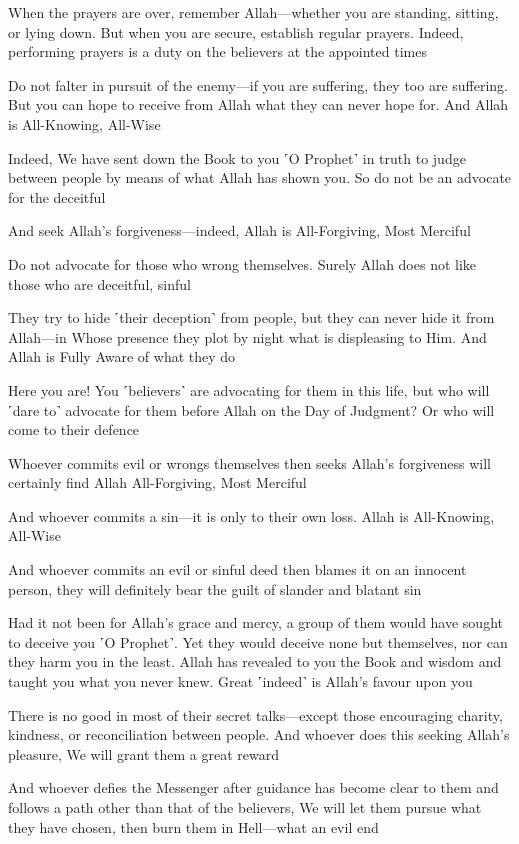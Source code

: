 When the prayers are over, remember Allah—whether you are standing, sitting, or lying down. But when you are secure, establish regular prayers. Indeed, performing prayers is a duty on the believers at the appointed times

Do not falter in pursuit of the enemy—if you are suffering, they too are suffering. But you can hope to receive from Allah what they can never hope for. And Allah is All-Knowing, All-Wise

Indeed, We have sent down the Book to you ˹O Prophet˺ in truth to judge between people by means of what Allah has shown you. So do not be an advocate for the deceitful

And seek Allah’s forgiveness—indeed, Allah is All-Forgiving, Most Merciful

Do not advocate for those who wrong themselves. Surely Allah does not like those who are deceitful, sinful

They try to hide ˹their deception˺ from people, but they can never hide it from Allah—in Whose presence they plot by night what is displeasing to Him. And Allah is Fully Aware of what they do

Here you are! You ˹believers˺ are advocating for them in this life, but who will ˹dare to˺ advocate for them before Allah on the Day of Judgment? Or who will come to their defence

Whoever commits evil or wrongs themselves then seeks Allah’s forgiveness will certainly find Allah All-Forgiving, Most Merciful

And whoever commits a sin—it is only to their own loss. Allah is All-Knowing, All-Wise

And whoever commits an evil or sinful deed then blames it on an innocent person, they will definitely bear the guilt of slander and blatant sin

Had it not been for Allah’s grace and mercy, a group of them would have sought to deceive you ˹O Prophet˺. Yet they would deceive none but themselves, nor can they harm you in the least. Allah has revealed to you the Book and wisdom and taught you what you never knew. Great ˹indeed˺ is Allah’s favour upon you

There is no good in most of their secret talks—except those encouraging charity, kindness, or reconciliation between people. And whoever does this seeking Allah’s pleasure, We will grant them a great reward

And whoever defies the Messenger after guidance has become clear to them and follows a path other than that of the believers, We will let them pursue what they have chosen, then burn them in Hell—what an evil end

